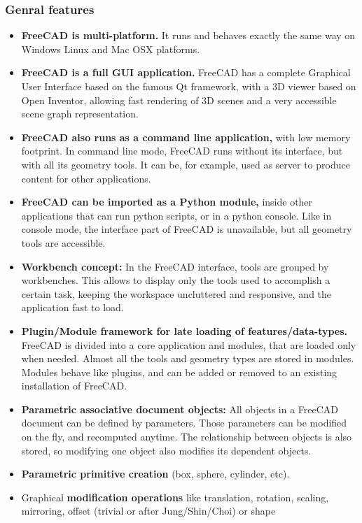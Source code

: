 \subsubsection{Genral features}
\begin{itemize}
\item \textbf{FreeCAD is multi-platform.} It runs and behaves exactly the same 
way on Windows Linux and Mac OSX platforms.
\item \textbf{FreeCAD is a full GUI application.} FreeCAD has a complete Graphical 
User Interface based on the famous Qt framework, with a 3D viewer based on
Open Inventor, allowing fast rendering of 3D scenes and a very accessible 
scene graph representation.
\item \textbf{FreeCAD also runs as a command line application,} with low memory 
footprint. In command line mode, FreeCAD runs without its interface, but 
with all its geometry tools. It can be, for example, used as server to 
produce content for other applications.
\item \textbf{FreeCAD can be imported as a Python module,} inside other applications 
that can run python scripts, or in a python console. Like in console mode, 
the interface part of FreeCAD is unavailable, but all geometry tools are accessible.
\item \textbf{Workbench concept:} In the FreeCAD interface, tools are grouped 
by workbenches. This allows to display only the tools used to accomplish 
a certain task, keeping the workspace uncluttered and responsive, and the 
application fast to load.
\item \textbf{Plugin/Module framework for late loading of features/data-types.} 
FreeCAD is divided into a core application and modules, that are loaded 
only when needed. Almost all the tools and geometry types are stored in 
modules. Modules behave like plugins, and can be added or removed to an 
existing installation of FreeCAD.
\item \textbf{Parametric associative document objects:} All objects in a FreeCAD 
document can be defined by parameters. Those parameters can be modified 
on the fly, and recomputed anytime. The relationship between objects is 
also stored, so modifying one object also modifies its dependent objects.
\item \textbf{Parametric primitive creation} (box, sphere, cylinder, etc).
\item Graphical \textbf{modification operations} like translation, rotation, 
scaling, mirroring, offset (trivial or after Jung/Shin/Choi) or shape 

\end{itemize}
